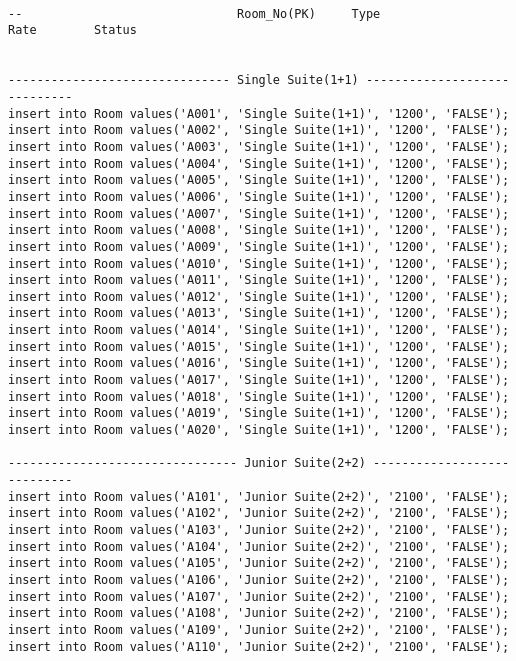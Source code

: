 \documentclass[a4,12pt]{report}
\begin{document}
\begin{lstlisting}

--								Room_No(PK)		Type				Rate		Status


------------------------------- Single Suite(1+1) -----------------------------
insert into Room values('A001', 'Single Suite(1+1)', '1200', 'FALSE');
insert into Room values('A002', 'Single Suite(1+1)', '1200', 'FALSE');
insert into Room values('A003', 'Single Suite(1+1)', '1200', 'FALSE');
insert into Room values('A004', 'Single Suite(1+1)', '1200', 'FALSE');
insert into Room values('A005', 'Single Suite(1+1)', '1200', 'FALSE');
insert into Room values('A006', 'Single Suite(1+1)', '1200', 'FALSE');
insert into Room values('A007', 'Single Suite(1+1)', '1200', 'FALSE');
insert into Room values('A008', 'Single Suite(1+1)', '1200', 'FALSE');
insert into Room values('A009', 'Single Suite(1+1)', '1200', 'FALSE');
insert into Room values('A010', 'Single Suite(1+1)', '1200', 'FALSE');
insert into Room values('A011', 'Single Suite(1+1)', '1200', 'FALSE');
insert into Room values('A012', 'Single Suite(1+1)', '1200', 'FALSE');
insert into Room values('A013', 'Single Suite(1+1)', '1200', 'FALSE');
insert into Room values('A014', 'Single Suite(1+1)', '1200', 'FALSE');
insert into Room values('A015', 'Single Suite(1+1)', '1200', 'FALSE');
insert into Room values('A016', 'Single Suite(1+1)', '1200', 'FALSE');
insert into Room values('A017', 'Single Suite(1+1)', '1200', 'FALSE');
insert into Room values('A018', 'Single Suite(1+1)', '1200', 'FALSE');
insert into Room values('A019', 'Single Suite(1+1)', '1200', 'FALSE');
insert into Room values('A020', 'Single Suite(1+1)', '1200', 'FALSE');

-------------------------------- Junior Suite(2+2) ----------------------------
insert into Room values('A101', 'Junior Suite(2+2)', '2100', 'FALSE');
insert into Room values('A102', 'Junior Suite(2+2)', '2100', 'FALSE');
insert into Room values('A103', 'Junior Suite(2+2)', '2100', 'FALSE');
insert into Room values('A104', 'Junior Suite(2+2)', '2100', 'FALSE');
insert into Room values('A105', 'Junior Suite(2+2)', '2100', 'FALSE');
insert into Room values('A106', 'Junior Suite(2+2)', '2100', 'FALSE');
insert into Room values('A107', 'Junior Suite(2+2)', '2100', 'FALSE');
insert into Room values('A108', 'Junior Suite(2+2)', '2100', 'FALSE');
insert into Room values('A109', 'Junior Suite(2+2)', '2100', 'FALSE');
insert into Room values('A110', 'Junior Suite(2+2)', '2100', 'FALSE');


\end{lstlisting}
\end{document}
